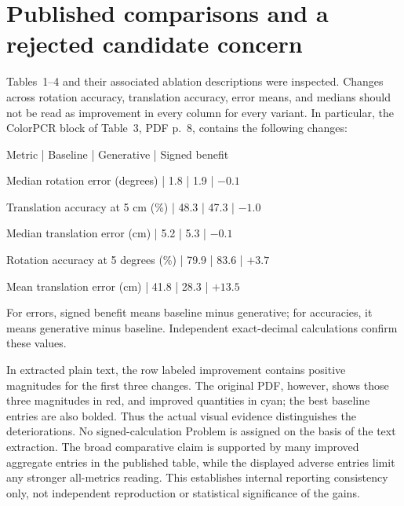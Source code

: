 \documentclass[10pt]{article}
\begin{document}
\section*{Published comparisons and a rejected candidate concern}
Tables 1–4 and their associated ablation descriptions were inspected. Changes across rotation accuracy, translation accuracy, error means, and medians should not be read as improvement in every column for every variant. In particular, the ColorPCR block of Table 3, PDF p. 8, contains the following changes:\par
Metric | Baseline | Generative | Signed benefit\par
Median rotation error (degrees) | 1.8 | 1.9 | \(-0.1\)\par
Translation accuracy at 5 cm (\%) | 48.3 | 47.3 | \(-1.0\)\par
Median translation error (cm) | 5.2 | 5.3 | \(-0.1\)\par
Rotation accuracy at 5 degrees (\%) | 79.9 | 83.6 | \(+3.7\)\par
Mean translation error (cm) | 41.8 | 28.3 | \(+13.5\)\par
For errors, signed benefit means baseline minus generative; for accuracies, it means generative minus baseline. Independent exact-decimal calculations confirm these values.\par
In extracted plain text, the row labeled improvement contains positive magnitudes for the first three changes. The original PDF, however, shows those three magnitudes in red, and improved quantities in cyan; the best baseline entries are also bolded. Thus the actual visual evidence distinguishes the deteriorations. No signed-calculation Problem is assigned on the basis of the text extraction. The broad comparative claim is supported by many improved aggregate entries in the published table, while the displayed adverse entries limit any stronger all-metrics reading. This establishes internal reporting consistency only, not independent reproduction or statistical significance of the gains.\par
\end{document}
